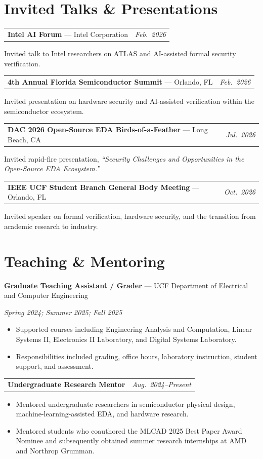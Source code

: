 \documentclass[11pt,letterpaper]{article}
\makeatletter
\newcommand{\entry}[2]{\par\noindent
  \begin{tabularx}{\textwidth}{@{}>{\raggedright\arraybackslash}X@{\hspace{1em}}r@{}}
    #1 & \textit{#2}
  \end{tabularx}\par}
\makeatother
\begin{document}
\section*{Invited Talks \& Presentations}
\entry{\textbf{Intel AI Forum} --- Intel Corporation}{Feb.\ 2026}
Invited talk to Intel researchers on ATLAS and AI-assisted formal security verification.\par
\vspace{4pt}
\entry{\textbf{4th Annual Florida Semiconductor Summit} --- Orlando, FL}{Feb.\ 2026}
Invited presentation on hardware security and AI-assisted verification within the semiconductor
ecosystem.\par
\vspace{4pt}
\entry{\textbf{DAC 2026 Open-Source EDA Birds-of-a-Feather} --- Long Beach, CA}{Jul.\ 2026}
Invited rapid-fire presentation, \textit{``Security Challenges and Opportunities in the Open-Source
EDA Ecosystem.''}\par
\vspace{4pt}
\entry{\textbf{IEEE UCF Student Branch General Body Meeting} --- Orlando, FL}{Oct.\ 2026}
Invited speaker on formal verification, hardware security, and the transition from academic research
to industry.\par

\section*{Teaching \& Mentoring}
\textbf{Graduate Teaching Assistant / Grader} --- UCF Department of Electrical and Computer Engineering\par
\textit{Spring 2024; Summer 2025; Fall 2025}
\begin{itemize}
  \item Supported courses including Engineering Analysis and Computation, Linear Systems II,
  Electronics II Laboratory, and Digital Systems Laboratory.
  \item Responsibilities included grading, office hours, laboratory instruction, student support,
  and assessment.
\end{itemize}
\vspace{4pt}
\entry{\textbf{Undergraduate Research Mentor}}{Aug.\ 2024--Present}
\begin{itemize}
  \item Mentored undergraduate researchers in semiconductor physical design,
  machine-learning-assisted EDA, and hardware research.
  \item Mentored students who coauthored the MLCAD 2025 Best Paper Award Nominee and subsequently
  obtained summer research internships at AMD and Northrop Grumman.
\end{itemize}
\end{document}
